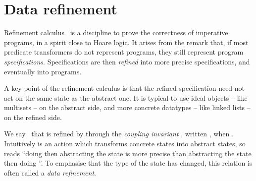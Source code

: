 \documentclass[]{llncs}
\begin{document}
\section{Data refinement}
\par
Refinement calculus~\cite{Back1998,VonWright1994} is a discipline to prove the correctness of imperative programs, in a spirit close to Hoare logic. It arises from the remark that, if most predicate transformers do not represent programs, they still represent program \emph{specifications}. Specifications are then \emph{refined} into more precise specifications, and eventually into programs.
\par
A key point of the refinement calculus is that the refined specification need not act on the same state as the abstract one. It is typical to use ideal objects -- like multisets -- on the abstract side, and more concrete datatypes -- like linked lists -- on the refined side.
\par
We say~\cite{VonWright1994} that  is refined by  through the \emph{coupling invariant} , written , when . Intuitively  is an action which transforms concrete states into abstract states, so  reads ``doing  then abstracting the state is more precise than abstracting the state then doing ''. To emphasise that the type of the state has changed, this relation is often called a \emph{data refinement}.
\par
\par
\end{document}
